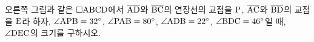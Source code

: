 \noindent\begin{minipage}[t]{0.58\linewidth}\vspace{0pt}\raggedright 오른쪽 그림과 같은 $\square\mathrm{ABCD}$에서 $\overline{\mathrm{AD}}$와 $\overline{\mathrm{BC}}$의 연장선의 교점을 $\mathrm{P}$, $\overline{\mathrm{AC}}$와 $\overline{\mathrm{BD}}$의 교점을 $\mathrm{E}$라 하자. $\angle\mathrm{APB}=32^\circ$, $\angle\mathrm{PAB}=80^\circ$, $\angle\mathrm{ADB}=22^\circ$, $\angle\mathrm{BDC}=46^\circ$일 때, $\angle\mathrm{DEC}$의 크기를 구하시오.\end{minipage}\hfill\begin{minipage}[t]{0.4\linewidth}\vspace{0pt}\centering \resizebox{\ifdim\width>\linewidth\linewidth\else\width\fi}{!}{}\end{minipage}\par

